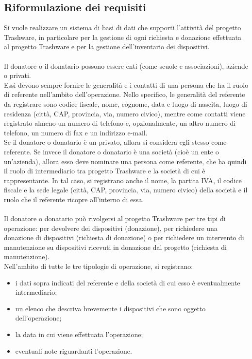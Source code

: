\documentclass[a4paper,12pt]{report}
\begin{document}
\subsection{Riformulazione dei requisiti}

Si vuole realizzare un sistema di basi di dati che supporti l'attività del progetto Trashware, in particolare per la gestione di ogni richiesta e donazione effettuata al progetto Trashware e per la gestione dell'inventario dei dispositivi.
\\\\
Il donatore o il donatario possono essere enti (come scuole e associazioni), aziende o privati. \\
Essi devono sempre fornire le generalità e i contatti di una persona che ha il ruolo di referente nell’ambito dell’operazione. Nello specifico, le generalità del referente da registrare sono codice fiscale, nome, cognome, data e luogo di nascita, luogo di residenza (città, CAP, provincia, via, numero civico), mentre come contatti viene registrato almeno un numero di telefono e, opzionalmente, un altro numero di telefono, un numero di fax e un indirizzo e-mail. \\
Se il donatore o donatario è un privato, allora si considera egli stesso come referente. Se invece il donatore o donatario è una società (cioè un ente o un'azienda), allora esso deve nominare una persona come referente, che ha quindi il ruolo di intermediario tra progetto Trashware e la società di cui è rappresentante. In tal caso, si registrano anche il nome, la partita IVA, il codice fiscale e la sede legale (città, CAP, provincia, via, numero civico) della società e il ruolo che il referente ricopre all'interno di essa.
\\\\
Il donatore o donatario può rivolgersi al progetto Trashware per tre tipi di operazione: per devolvere dei dispositivi (donazione), per richiedere una donazione di dispositivi (richiesta di donazione) o per richiedere un intervento di manutenzione su dispositivi ricevuti in donazione dal progetto (richiesta di manutenzione).
\\
Nell'ambito di tutte le tre tipologie di operazione, si registrano:
\begin{itemize}
	\item i dati sopra indicati del referente e della società di cui esso è eventualmente intermediario;
	\item un elenco che descriva brevemente i dispositivi che sono oggetto dell'operazione;
	\item la data in cui viene effettuata l'operazione;
	\item eventuali note riguardanti l'operazione.
\end{itemize}
\end{document}
